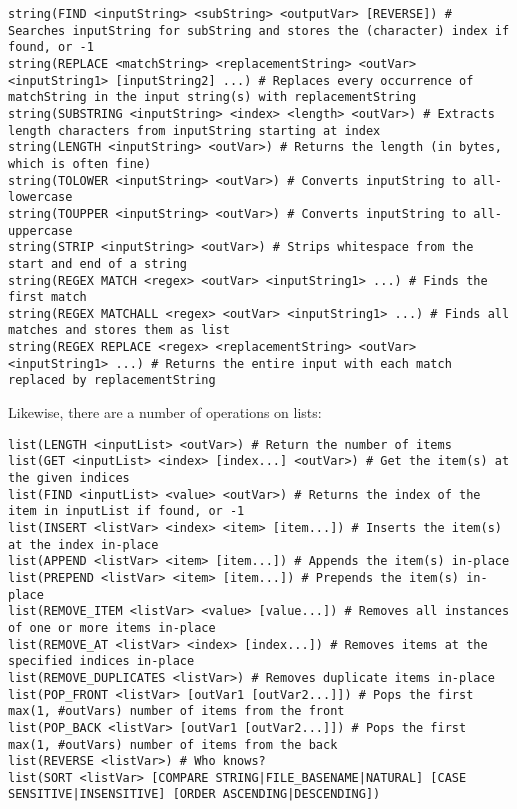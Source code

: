 \documentclass[8pt, table, xcdraw]{article}%
\begin{document}
\begin{lstlisting}
string(FIND <inputString> <subString> <outputVar> [REVERSE]) # Searches inputString for subString and stores the (character) index if found, or -1
string(REPLACE <matchString> <replacementString> <outVar> <inputString1> [inputString2] ...) # Replaces every occurrence of matchString in the input string(s) with replacementString
string(SUBSTRING <inputString> <index> <length> <outVar>) # Extracts length characters from inputString starting at index
string(LENGTH <inputString> <outVar>) # Returns the length (in bytes, which is often fine)
string(TOLOWER <inputString> <outVar>) # Converts inputString to all-lowercase
string(TOUPPER <inputString> <outVar>) # Converts inputString to all-uppercase
string(STRIP <inputString> <outVar>) # Strips whitespace from the start and end of a string
string(REGEX MATCH <regex> <outVar> <inputString1> ...) # Finds the first match
string(REGEX MATCHALL <regex> <outVar> <inputString1> ...) # Finds all matches and stores them as list
string(REGEX REPLACE <regex> <replacementString> <outVar> <inputString1> ...) # Returns the entire input with each match replaced by replacementString
\end{lstlisting}

Likewise, there are a number of operations on lists:

\begin{lstlisting}
list(LENGTH <inputList> <outVar>) # Return the number of items
list(GET <inputList> <index> [index...] <outVar>) # Get the item(s) at the given indices
list(FIND <inputList> <value> <outVar>) # Returns the index of the item in inputList if found, or -1 
list(INSERT <listVar> <index> <item> [item...]) # Inserts the item(s) at the index in-place
list(APPEND <listVar> <item> [item...]) # Appends the item(s) in-place
list(PREPEND <listVar> <item> [item...]) # Prepends the item(s) in-place
list(REMOVE_ITEM <listVar> <value> [value...]) # Removes all instances of one or more items in-place
list(REMOVE_AT <listVar> <index> [index...]) # Removes items at the specified indices in-place
list(REMOVE_DUPLICATES <listVar>) # Removes duplicate items in-place
list(POP_FRONT <listVar> [outVar1 [outVar2...]]) # Pops the first max(1, #outVars) number of items from the front
list(POP_BACK <listVar> [outVar1 [outVar2...]]) # Pops the first max(1, #outVars) number of items from the back
list(REVERSE <listVar>) # Who knows?
list(SORT <listVar> [COMPARE STRING|FILE_BASENAME|NATURAL] [CASE SENSITIVE|INSENSITIVE] [ORDER ASCENDING|DESCENDING])
\end{lstlisting}
\end{document}
